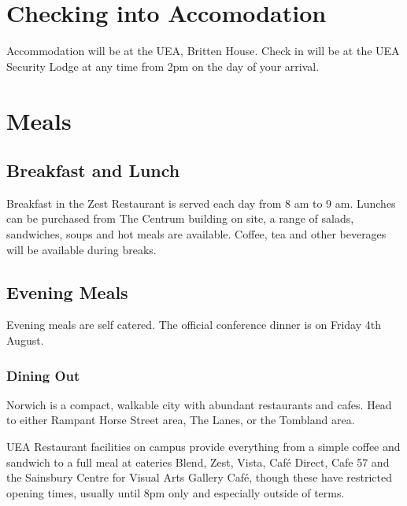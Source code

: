 \documentclass[12pt,]{book}
\begin{document}
\section*{Checking into Accomodation}\label{checking-into-accomodation}

Accommodation will be at the UEA, Britten House. Check in will be at the
UEA Security Lodge at any time from 2pm on the day of your arrival.

\section*{Meals}\label{meals}

\subsection*{Breakfast and Lunch}\label{breakfast-and-lunch}

Breakfast in the Zest Restaurant is served each day from 8 am to 9 am.
Lunches can be purchased from The Centrum building on site, a range of
salads, sandwiches, soups and hot meals are available. Coffee, tea and
other beverages will be available during breaks.

\subsection*{Evening Meals}\label{evening-meals}

Evening meals are self catered. The official conference dinner is on
Friday 4th August.

\subsubsection*{Dining Out}\label{dining-out}

Norwich is a compact, walkable city with abundant restaurants and cafes.
Head to either Rampant Horse Street area, The Lanes, or the Tombland
area.

UEA Restaurant facilities on campus provide everything from a simple
coffee and sandwich to a full meal at eateries Blend, Zest, Vista, Café
Direct, Cafe 57 and the Sainsbury Centre for Visual Arts Gallery Café,
though these have restricted opening times, usually until 8pm only and
especially outside of terms.
\end{document}
